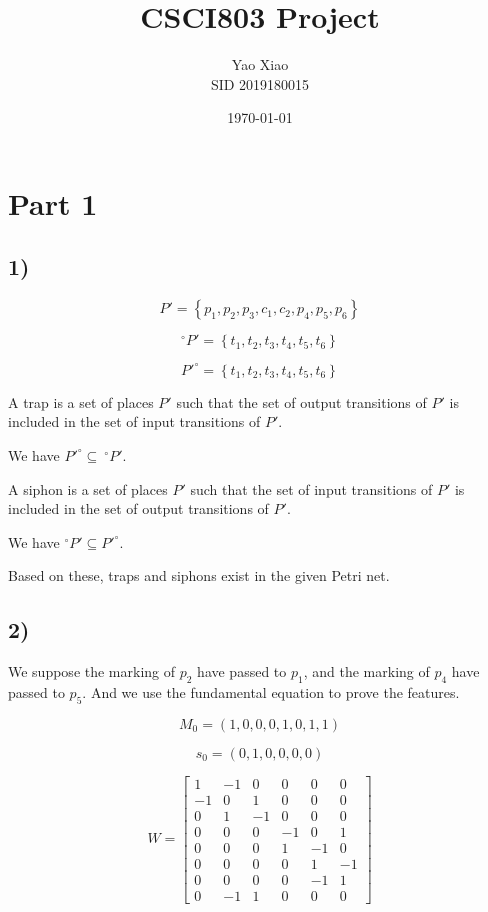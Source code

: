 \documentclass{article}
\title{CSCI803 Project}
\author{Yao Xiao \\ SID 2019180015}
\date{\today}
\begin{document}
\maketitle

\section{Part 1}
\subsection{1)}
$$P'=\left\{p_1,p_2,p_3,c_1,c_2,p_4,p_5,p_6\right\}$$

$$^{\circ}P'=\left\{t_1,t_2,t_3,t_4,t_5,t_6\right\}$$

$$P'^{\circ}=\left\{t_1,t_2,t_3,t_4,t_5,t_6\right\}$$

A trap is a set of places $P′$ such that the set of output transitions of $P′$ is included in the set of input transitions of $P′$.

We have $P'^{\circ} \subseteq \ ^{\circ}P'$.

A siphon is a set of places $P′$ such that the set of input transitions of $P′$ is included in the set of output transitions of $P′$.

We have $^{\circ}P' \subseteq P'^{\circ}$.

Based on these, traps and siphons exist in the given Petri net.

\subsection{2)}
We suppose the marking of $p_2$ have passed to $p_1$, and the marking of $p_4$ have passed to $p_5$. And we use the fundamental equation to prove the features.

$$M_0 = (1,0,0,0,1,0,1,1)$$

$$s_0 = (0,1,0,0,0,0)$$

$$W = 
  \left[
  \begin{matrix}
   1 & -1 & 0 & 0 & 0 & 0\\
   -1 & 0 & 1 & 0 & 0 & 0\\
   0 & 1 & -1 & 0 & 0 & 0\\
   0 & 0 & 0 & -1 & 0 & 1\\
   0 & 0 & 0 & 1 & -1 & 0\\
   0 & 0 & 0 & 0 & 1 & -1\\
   0 & 0 & 0 & 0 & -1 & 1\\
   0 & -1 & 1 & 0 & 0 & 0
  \end{matrix}
  \right]
$$
\end{document}
